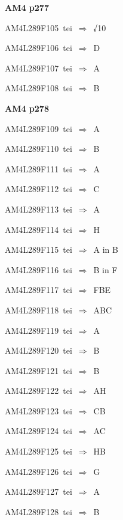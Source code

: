 \par\vfill\eject
{\bf\hfill AM4 p277\hfill\hbox{}}\par\bigskip
{\sixrm AM4L289F105\ {\sixit tei}\ }$\Rightarrow$\ √10\par\smallskip
{\sixrm AM4L289F106\ {\sixit tei}\ }$\Rightarrow$\ D\par\smallskip
{\sixrm AM4L289F107\ {\sixit tei}\ }$\Rightarrow$\ A\par\smallskip
{\sixrm AM4L289F108\ {\sixit tei}\ }$\Rightarrow$\ B\par\smallskip

\par\vfill\eject
{\bf\hfill AM4 p278\hfill\hbox{}}\par\bigskip
{\sixrm AM4L289F109\ {\sixit tei}\ }$\Rightarrow$\ A\par\smallskip
{\sixrm AM4L289F110\ {\sixit tei}\ }$\Rightarrow$\ B\par\smallskip
{\sixrm AM4L289F111\ {\sixit tei}\ }$\Rightarrow$\ A\par\smallskip
{\sixrm AM4L289F112\ {\sixit tei}\ }$\Rightarrow$\ C\par\smallskip
{\sixrm AM4L289F113\ {\sixit tei}\ }$\Rightarrow$\ A\par\smallskip
{\sixrm AM4L289F114\ {\sixit tei}\ }$\Rightarrow$\ H\par\smallskip
{\sixrm AM4L289F115\ {\sixit tei}\ }$\Rightarrow$\ A {\tenit in} B\par\smallskip
{\sixrm AM4L289F116\ {\sixit tei}\ }$\Rightarrow$\ B {\tenit in} F\par\smallskip
{\sixrm AM4L289F117\ {\sixit tei}\ }$\Rightarrow$\ FBE\par\smallskip
{\sixrm AM4L289F118\ {\sixit tei}\ }$\Rightarrow$\ ABC\par\smallskip
{\sixrm AM4L289F119\ {\sixit tei}\ }$\Rightarrow$\ A\par\smallskip
{\sixrm AM4L289F120\ {\sixit tei}\ }$\Rightarrow$\ B\par\smallskip
{\sixrm AM4L289F121\ {\sixit tei}\ }$\Rightarrow$\ B\par\smallskip
{\sixrm AM4L289F122\ {\sixit tei}\ }$\Rightarrow$\ AH\par\smallskip
{\sixrm AM4L289F123\ {\sixit tei}\ }$\Rightarrow$\ CB\par\smallskip
{\sixrm AM4L289F124\ {\sixit tei}\ }$\Rightarrow$\ AC\par\smallskip
{\sixrm AM4L289F125\ {\sixit tei}\ }$\Rightarrow$\ HB\par\smallskip
{\sixrm AM4L289F126\ {\sixit tei}\ }$\Rightarrow$\ G\par\smallskip
{\sixrm AM4L289F127\ {\sixit tei}\ }$\Rightarrow$\ A\par\smallskip
{\sixrm AM4L289F128\ {\sixit tei}\ }$\Rightarrow$\ B\par\smallskip

